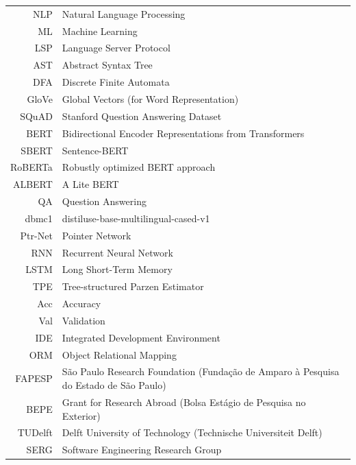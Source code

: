 \documentclass[12pt,twoside,brazilian,english]{book}
\begin{document}
\begin{tabular}{rl}
    NLP & Natural Language Processing \\
    ML & Machine Learning \\
    LSP & Language Server Protocol \\
    AST & Abstract Syntax Tree \\
    DFA & Discrete Finite Automata \\
    GloVe & Global Vectors (for Word Representation) \\
    SQuAD & Stanford Question Answering Dataset  \\
    BERT & Bidirectional Encoder Representations from Transformers \\
    SBERT & Sentence-BERT \\
    RoBERTa & Robustly optimized BERT approach \\
    ALBERT & A Lite BERT \\
    QA & Question Answering \\
    dbmc1 & distiluse-base-multilingual-cased-v1 \\
    Ptr-Net & Pointer Network \\
    RNN & Recurrent Neural Network \\
    LSTM & Long Short-Term Memory \\
    TPE & Tree-structured Parzen Estimator \\
    Acc & Accuracy \\
    Val & Validation \\
    IDE & Integrated Development Environment \\
    ORM & Object Relational Mapping  \\
    FAPESP & São Paulo Research Foundation (Fundação de Amparo à Pesquisa do Estado de São Paulo) \\
    BEPE & Grant for Research Abroad (Bolsa Estágio de Pesquisa no Exterior) \\
    TUDelft & Delft University of Technology (Technische Universiteit Delft) \\
    SERG & Software Engineering Research Group\\
\end{tabular}

\end{document}
